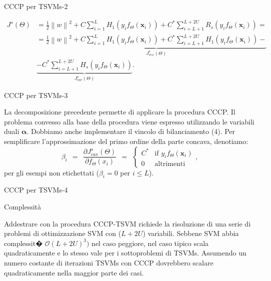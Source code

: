 \documentclass[mathserif]{beamer}
\begin{document}
\begin{frame}{CCCP per TSVMs-2}
\begin{block}{}
\begin{equation}
\begin{split}
J^s(\Theta)& =\frac{1}{2}\left\|w\right\|^2+C\sum_{i=1}^{L}H_1(y_if_\Theta(\textbf{x}_i))+C^*\sum_{i=L+1}^{L+2U}R_s(y_if_\Theta(\textbf{x}_i))=\\
 & =\underbrace{\frac{1}{2}\left\|w\right\|^2+C\sum_{i=1}^{L}H_1(y_if_\Theta(\textbf{x}_i))+C^*\sum_{i=L+1}^{L+2U}H_1(y_if_\Theta(\textbf{x}_i))-}_{J^s_{vex}(\Theta)}\\
 &\underbrace{-C^*\sum_{i=L+1}^{L+2U}H_s(y_if_\Theta(\textbf{x}_i))}_{J^s_{cav}(\Theta)}.
\end{split}
\end{equation}
\end{block}
\end{frame}

\begin{frame}{CCCP per TSVMs-3}
\begin{block}{}
La decomposizione precedente permette di applicare la procedura CCCP. Il problema convesso alla base della procedura viene espresso utilizzando le variabili duali $\boldsymbol\alpha$. Dobbiamo anche implementare il vincolo di bilanciamento (4). 
Per semplificare l'approssimazione del primo ordine della parte concava, denotiamo:
\begin{equation}
\beta_i\ \  =\ \ 	\frac{\partial J_{cav}^{s}(\Theta)}{\partial f_{\Theta}(x_i)} \ \  = \ \ 
\begin{cases} 
C^* & \text{if } y_if_\Theta(\textbf{x}_i) \\
0 & \text{altrimenti }
\end{cases},
\end{equation}
per gli esempi non etichettati ($\beta_i=0$ per $i \leq L$).
\end{block}
\end{frame}


\begin{frame}{CCCP per TSVMs-4}
\end{frame}

\begin{frame}{Complessit\`a}
\begin{block}{}
Addestrare con la procedura CCCP-TSVM richiede la risoluzione di una serie di problemi di ottimizzazione SVM con ($L+2U$) variabili. Sebbene SVM abbia complessit� $ \mathcal{O} (L+2U)^3)$ nel caso peggiore, nel caso tipico scala quadraticamente e lo stesso vale per i sottoproblemi di TSVMs. Assumendo un numero costante di iterazioni TSVMs con CCCP dovrebbero scalare quadraticamente nella maggior parte dei casi.
\end{block}
\end{frame}
\end{document}
